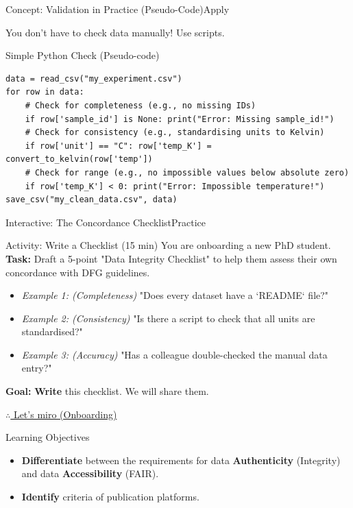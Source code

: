 \begin{frame}[fragile]{Concept: Validation in Practice (Pseudo-Code)}{Apply}
    
    You don't have to check data manually! Use scripts.
    
    \begin{block}{Simple Python Check (Pseudo-code)}
\begin{verbatim}
data = read_csv("my_experiment.csv")
for row in data:
    # Check for completeness (e.g., no missing IDs)
    if row['sample_id'] is None: print("Error: Missing sample_id!")
    # Check for consistency (e.g., standardising units to Kelvin)
    if row['unit'] == "C": row['temp_K'] = convert_to_kelvin(row['temp'])
    # Check for range (e.g., no impossible values below absolute zero)
    if row['temp_K'] < 0: print("Error: Impossible temperature!")
save_csv("my_clean_data.csv", data)
\end{verbatim}
    \end{block}
\end{frame}

\begin{frame}{Interactive: The Concordance Checklist}{Practice}
    \begin{block}{Activity: Write a Checklist (15 min)}
        You are onboarding a new PhD student.
        \pause
        \textbf{Task:} Draft a 5-point "Data Integrity Checklist" to help them assess their own concordance with DFG guidelines.
        \pause
        \begin{itemize}
            \item \emph{Example 1: (Completeness)} "Does every dataset have a `README` file?"
            \item \emph{Example 2: (Consistency)} "Is there a script to check that all units are standardised?"
            \item \emph{Example 3: (Accuracy)} "Has a colleague double-checked the manual data entry?"
        \end{itemize}
        \pause
        \textbf{Goal:} \textbf{Write} this checklist. We will share them.
    \end{block}
    \href{https://miro.com/app/board/uXjVJpI_9Kc=/?moveToWidget=3458764649162553531&cot=14}{$\therefore$ Let's miro (Onboarding)}
\end{frame}

\begin{frame}{Learning Objectives}
    \begin{itemize}
        \item \textbf{Differentiate} between the requirements for data \textbf{Authenticity} (Integrity) and data \textbf{Accessibility} (FAIR).
        \item \textbf{Identify} criteria of publication platforms.
    \end{itemize}
\end{frame}

